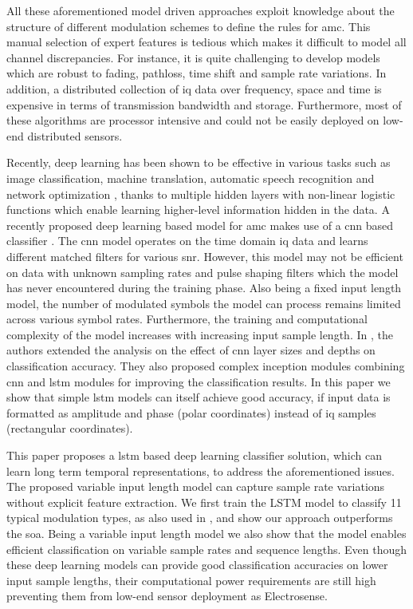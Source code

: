All these aforementioned model driven approaches exploit knowledge about the structure of different modulation schemes to define the rules for \ac{amc}. This manual selection of expert features is tedious which makes it difficult to model all channel discrepancies. For instance, it is quite challenging to develop models which are robust to 
fading, pathloss, time shift and sample rate variations. In addition, a distributed collection of \ac{iq} data over frequency, space and time is expensive in terms of transmission bandwidth and storage. Furthermore, most of these algorithms are processor intensive and could not be easily deployed on low-end distributed sensors.


Recently, deep learning has been shown to be effective in various tasks such as image classification, machine translation, automatic speech recognition \cite{deeplearn} and network optimization \cite{cobanets}, thanks to multiple hidden layers with non-linear logistic functions which enable learning higher-level information hidden in the data. A recently proposed deep learning based model for \ac{amc} makes use of a \ac{cnn} based classifier \cite{o2016convolutional}. The \ac{cnn} model operates on the time domain \ac{iq} data and learns different matched filters for various \ac{snr}. However, this model may not be efficient on data with unknown sampling rates and pulse shaping filters which the model has never encountered during the training phase. Also being a fixed input length model, the number of modulated symbols the model can process remains limited across various symbol rates. Furthermore, the training and computational complexity of the model increases with increasing input sample length. In \cite{baseline}, the authors extended the analysis on the effect of \ac{cnn} layer sizes and depths on classification accuracy. They also proposed complex inception modules combining \ac{cnn} and \ac{lstm} modules for improving the classification results. In this paper we show that simple \ac{lstm} models can itself achieve good accuracy, if input data is formatted as amplitude and phase (polar coordinates) instead of \ac{iq} samples (rectangular coordinates).

This paper proposes a \ac{lstm} \cite{Hochreiter:lstm} based deep learning classifier solution, which can learn long term temporal representations, to address the aforementioned issues. The proposed variable input length model can capture sample rate variations without explicit feature extraction. We first train the LSTM model to classify 11 typical modulation types, as also used in \cite{o2016radio}, and show our approach outperforms the \ac{soa}. Being a variable input length model we also show that the model enables efficient classification on variable sample rates and sequence lengths. Even though these deep learning models can provide good classification accuracies on lower input sample lengths, their computational power requirements are still high preventing them from low-end sensor deployment as Electrosense.

